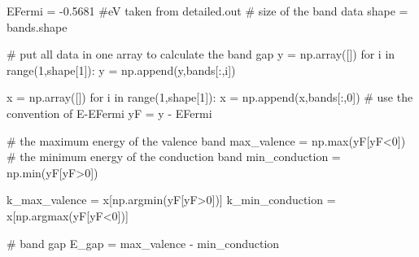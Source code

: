 \documentclass[
  letterpaper,
  DIV=11,
  numbers=noendperiod]{scrreprt}
\newenvironment{Shaded}{\begin{snugshade}}{\end{snugshade}}
\newcommand{\BuiltInTok}[1]{\textcolor[rgb]{0.00,0.23,0.31}{#1}}
\newcommand{\CommentTok}[1]{\textcolor[rgb]{0.37,0.37,0.37}{#1}}
\newcommand{\ControlFlowTok}[1]{\textcolor[rgb]{0.00,0.23,0.31}{#1}}
\newcommand{\DecValTok}[1]{\textcolor[rgb]{0.68,0.00,0.00}{#1}}
\newcommand{\FloatTok}[1]{\textcolor[rgb]{0.68,0.00,0.00}{#1}}
\newcommand{\KeywordTok}[1]{\textcolor[rgb]{0.00,0.23,0.31}{#1}}
\newcommand{\NormalTok}[1]{\textcolor[rgb]{0.00,0.23,0.31}{#1}}
\newcommand{\OperatorTok}[1]{\textcolor[rgb]{0.37,0.37,0.37}{#1}}
\begin{document}
\begin{Shaded}
\begin{Highlighting}[]
\NormalTok{EFermi }\OperatorTok{=} \OperatorTok{{-}}\FloatTok{0.5681} \CommentTok{\#eV taken from detailed.out}
\CommentTok{\# size of the band data}
\NormalTok{shape }\OperatorTok{=}\NormalTok{ bands.shape}

\CommentTok{\# put all data in one array to calculate the band gap}
\NormalTok{y }\OperatorTok{=}\NormalTok{ np.array([])}
\ControlFlowTok{for}\NormalTok{ i }\KeywordTok{in} \BuiltInTok{range}\NormalTok{(}\DecValTok{1}\NormalTok{,shape[}\DecValTok{1}\NormalTok{]):}
\NormalTok{    y }\OperatorTok{=}\NormalTok{ np.append(y,bands[:,i])}

\NormalTok{x }\OperatorTok{=}\NormalTok{ np.array([])}
\ControlFlowTok{for}\NormalTok{ i }\KeywordTok{in} \BuiltInTok{range}\NormalTok{(}\DecValTok{1}\NormalTok{,shape[}\DecValTok{1}\NormalTok{]):}
\NormalTok{    x }\OperatorTok{=}\NormalTok{ np.append(x,bands[:,}\DecValTok{0}\NormalTok{])}
\CommentTok{\# use the convention of E{-}EFermi  }
\NormalTok{yF }\OperatorTok{=}\NormalTok{ y }\OperatorTok{{-}}\NormalTok{ EFermi}

\CommentTok{\# the maximum energy of the valence band}
\NormalTok{max\_valence }\OperatorTok{=}\NormalTok{ np.}\BuiltInTok{max}\NormalTok{(yF[yF}\OperatorTok{\textless{}}\DecValTok{0}\NormalTok{])}
\CommentTok{\# the minimum energy of the conduction band}
\NormalTok{min\_conduction }\OperatorTok{=}\NormalTok{ np.}\BuiltInTok{min}\NormalTok{(yF[yF}\OperatorTok{\textgreater{}}\DecValTok{0}\NormalTok{])}

\NormalTok{k\_max\_valence }\OperatorTok{=}\NormalTok{ x[np.argmin(yF[yF}\OperatorTok{\textgreater{}}\DecValTok{0}\NormalTok{])]}
\NormalTok{k\_min\_conduction }\OperatorTok{=}\NormalTok{ x[np.argmax(yF[yF}\OperatorTok{\textless{}}\DecValTok{0}\NormalTok{])]}

\CommentTok{\# band gap}
\NormalTok{E\_gap }\OperatorTok{=}\NormalTok{ max\_valence }\OperatorTok{{-}}\NormalTok{ min\_conduction}
\end{Highlighting}
\end{Shaded}
\end{document}
